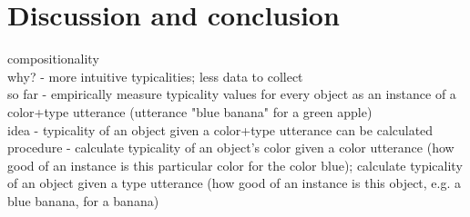 \documentclass[10pt,letterpaper]{article}
\begin{document}




\section{\bf Discussion and conclusion}
compositionality\\
why? - more intuitive typicalities; less data to collect\\
so far - empirically measure typicality values for every object as an instance of a color+type utterance (utterance "blue banana" for a green apple)\\
idea - typicality of an object given a color+type utterance can be calculated \\
procedure - calculate typicality of an object's color given a color utterance (how good of an instance is this particular color for the color blue); calculate typicality of an object given a type utterance (how good of an instance is this object, e.g. a blue banana, for a banana)
\end{document}
